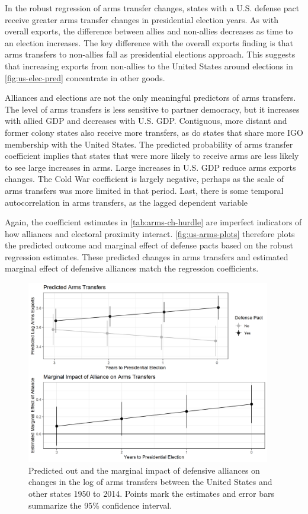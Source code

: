 \documentclass[12pt]{article}
\begin{document}
In the robust regression of arms transfer changes, states with a U.S. defense pact receive greater arms transfer changes in presidential election years. 
As with overall exports, the difference between allies and non-allies decreases as time to an election increases.
The key difference with the overall exports finding is that arms transfers to non-allies fall as presidential elections approach. 
This suggests that increasing exports from non-allies to the United States around elections in \autoref{fig:us-elec-pred} concentrate in other goods. 


Alliances and elections are not the only meaningful predictors of arms transfers.
The level of arms transfers is less sensitive to partner democracy, but it increases with allied GDP and decreases with U.S. GDP. 
Contiguous, more distant and former colony states also receive more transfers, as do states that share more IGO membership with the United States.
The predicted probability of arms transfer coefficient implies that states that were more likely to receive arms are less likely to see large increases in arms. 
Large increases in U.S. GDP reduce arms exports changes. 
The Cold War coefficient is largely negative, perhaps as the scale of arms transfers was more limited in that period. 
Last, there is some temporal autocorrelation in arms transfers, as the lagged dependent variable  


Again, the coefficient estimates in \autoref{tab:arms-ch-hurdle} are imperfect indicators of how alliances and electoral proximity interact.
\autoref{fig:us-arms-plots} therefore plots the predicted outcome and marginal effect of defense pacts based on the robust regression estimates.
These predicted changes in arms transfers and estimated marginal effect of defensive alliances match the regression coefficients.


\begin{figure}[htpb]
	\centering
		\includegraphics[width=0.95\textwidth]{../figures/us-arms-plots.png}
	\caption{Predicted out and the marginal impact of defensive alliances on changes in the log of arms transfers between the United States and other states 1950 to 2014. Points mark the estimates and error bars summarize the 95\% confidence interval.}
	\label{fig:us-arms-plots}
\end{figure}
\end{document}
